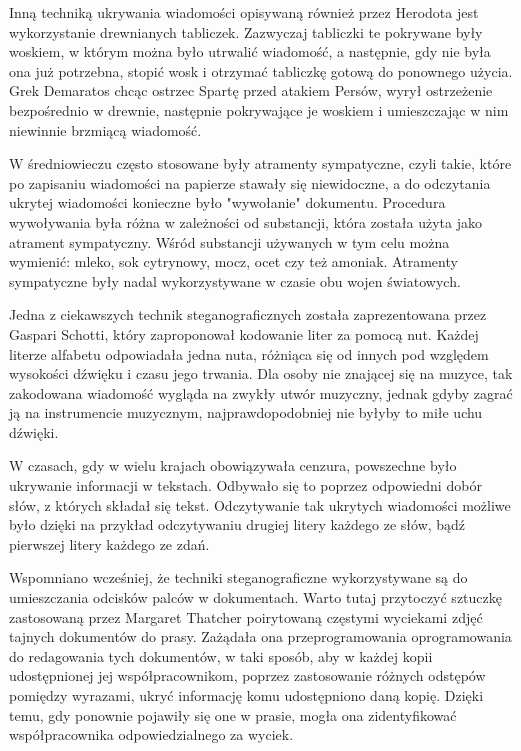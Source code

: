 \documentclass[a4paper, twoside]{report}
\begin{document}
        Inną techniką ukrywania wiadomości opisywaną również przez Herodota
        jest wykorzystanie drewnianych tabliczek. Zazwyczaj tabliczki te pokrywane
        były woskiem, w którym można było utrwalić wiadomość, a następnie, gdy
        nie była ona już potrzebna, stopić wosk i otrzymać tabliczkę gotową do
        ponownego użycia. Grek Demaratos chcąc ostrzec Spartę przed atakiem Persów,
        wyrył ostrzeżenie bezpośrednio w drewnie, następnie pokrywające je woskiem
        i umieszczając w nim niewinnie brzmiącą wiadomość.

        W średniowieczu często stosowane były atramenty sympatyczne, czyli takie,
        które po zapisaniu wiadomości na papierze stawały się niewidoczne, a do
        odczytania ukrytej wiadomości konieczne było "wywołanie" dokumentu. Procedura
        wywoływania była różna w zależności od substancji, która została użyta jako
        atrament sympatyczny. Wśród substancji używanych w tym celu można wymienić:
        mleko, sok cytrynowy, mocz, ocet czy też amoniak. Atramenty sympatyczne
        były nadal wykorzystywane w czasie obu wojen światowych.

        Jedna z ciekawszych technik steganograficznych została zaprezentowana przez
        Gaspari Schotti\cite{NUTYSTEGANOGRAFIA},
        który zaproponował kodowanie liter za pomocą nut. Każdej literze alfabetu
        odpowiadała jedna nuta, różniąca się od innych pod względem wysokości
        dźwięku i czasu jego trwania. Dla osoby nie znającej się na muzyce, tak zakodowana
        wiadomość wygląda na zwykły utwór muzyczny, jednak gdyby zagrać ją na instrumencie
        muzycznym, najprawdopodobniej nie byłyby to miłe uchu dźwięki.

        W czasach, gdy w wielu krajach obowiązywała cenzura, powszechne było ukrywanie
        informacji w tekstach. Odbywało się to poprzez odpowiedni dobór słów,
        z których składał się tekst. Odczytywanie tak ukrytych wiadomości możliwe było
        dzięki na przykład odczytywaniu drugiej litery każdego ze słów, bądź pierwszej
        litery każdego ze zdań.

        Wspomniano wcześniej, że techniki steganograficzne wykorzystywane są do umieszczania
        odcisków palców w dokumentach. Warto tutaj przytoczyć sztuczkę zastosowaną
        przez Margaret Thatcher poirytowaną częstymi wyciekami zdjęć tajnych dokumentów
        do prasy. Zażądała ona przeprogramowania oprogramowania do redagowania tych
        dokumentów, w taki sposób, aby w każdej kopii udostępnionej jej współpracownikom,
        poprzez zastosowanie różnych odstępów pomiędzy wyrazami, ukryć informację
        komu udostępniono daną kopię. Dzięki temu, gdy ponownie pojawiły się one w
        prasie, mogła ona zidentyfikować współpracownika odpowiedzialnego za wyciek.\cite{DIGITALWATERMARKING}
\end{document}
